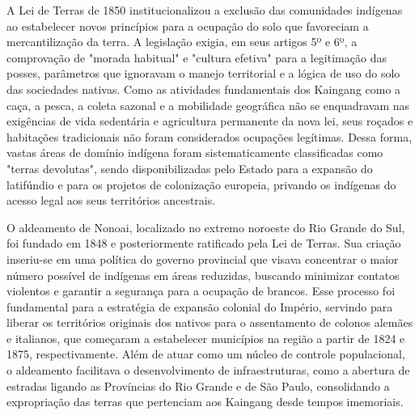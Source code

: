 \documentclass[12pt, a4paper]{article}
\begin{document}
A Lei de Terras de 1850 institucionalizou a exclusão das comunidades indígenas ao estabelecer novos princípios para a ocupação do solo que favoreciam a mercantilização da terra. A legislação exigia, em seus artigos 5º e 6º, a comprovação de "morada habitual" e "cultura efetiva" para a legitimação das posses, parâmetros que ignoravam o manejo territorial e a lógica de uso do solo das sociedades nativas. Como as atividades fundamentais dos Kaingang como a caça, a pesca, a coleta sazonal e a mobilidade geográfica não se enquadravam nas exigências de vida sedentária e agricultura permanente da nova lei, seus roçados e habitações tradicionais não foram considerados ocupações legítimas. Dessa forma, vastas áreas de domínio indígena foram sistematicamente classificadas como "terras devolutas", sendo disponibilizadas pelo Estado para a expansão do latifúndio e para os projetos de colonização europeia, privando os indígenas do acesso legal aos seus territórios ancestrais.  


O aldeamento de Nonoai, localizado no extremo noroeste do Rio Grande do Sul, foi fundado em 1848 e posteriormente ratificado pela Lei de Terras. Sua criação inseriu-se em uma política do governo provincial que visava concentrar o maior número possível de indígenas em áreas reduzidas, buscando minimizar contatos violentos e garantir a segurança para a ocupação de brancos. Esse processo foi fundamental para a estratégia de expansão colonial do Império, servindo para liberar os territórios originais dos nativos para o assentamento de colonos alemães e italianos, que começaram a estabelecer municípios na região a partir de 1824 e 1875, respectivamente. Além de atuar como um núcleo de controle populacional, o aldeamento facilitava o desenvolvimento de infraestruturas, como a abertura de estradas ligando as Províncias do Rio Grande e de São Paulo, consolidando a expropriação das terras que pertenciam aos Kaingang desde tempos imemoriais.  
\end{document}
